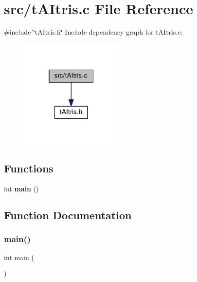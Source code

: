 \section{src/t\+A\+Itris.c File Reference}
\label{tAItris_8c}
{\ttfamily \#include \char`\"{}t\+A\+Itris.\+h\char`\"{}}\newline
Include dependency graph for t\+A\+Itris.\+c\+:
\nopagebreak
\begin{figure}[H]
\begin{center}
\leavevmode
\includegraphics[width=148pt]{tAItris_8c__incl}
\end{center}
\end{figure}
\subsection*{Functions}
\begin{DoxyCompactItemize}
\item 
int \textbf{ main} ()
\end{DoxyCompactItemize}


\subsection{Function Documentation}
\mbox{\label{tAItris_8c_ae66f6b31b5ad750f1fe042a706a4e3d4}} 
\subsubsection{main()}
{\footnotesize\ttfamily int main (\begin{DoxyParamCaption}{ }\end{DoxyParamCaption})}

